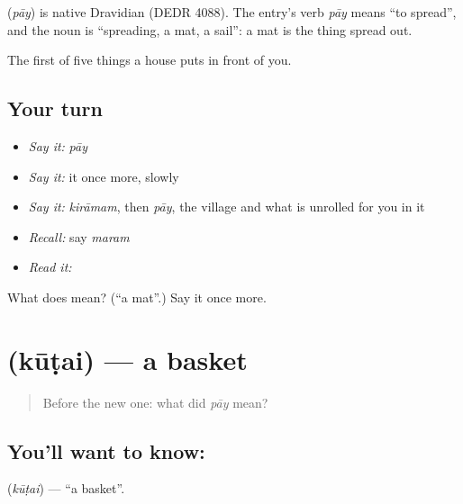 \begin{cousinweb}
\textbf{} (\emph{pāy}) is native Dravidian (DEDR 4088). The entry's verb \emph{pāy} means \textquotedblleft{}to spread\textquotedblright{}, and the noun is \textquotedblleft{}spreading, a mat, a sail\textquotedblright{}: a mat is the thing spread out.
\end{cousinweb}

\begin{grammarlens}[title={What you've built}]
The first of five things a house puts in front of you.
\end{grammarlens}

\subsection*{Your turn}
\begin{itemize}
\raggedright
  \item \emph{Say it:} \emph{pāy}
  \item \emph{Say it:} it once more, slowly
  \item \emph{Say it:} \emph{kirāmam}, then \emph{pāy}, the village and what is unrolled for you in it
  \item \emph{Recall:} say \emph{maram}
  \item \emph{Read it:} \textbf{}
\end{itemize}

\begin{tcolorbox}[breakable,colback=teal!4,colframe=teal!35!black,title={Before you move on}]
What does  mean? (\textquotedblleft{}a mat\textquotedblright{}.) Say it once more.
\end{tcolorbox}
\section[\texorpdfstring{\ta{கூடை} (kūṭai)}{கூடை (kūṭai)}]{ (kūṭai) — a basket}

\label{lesson:TA-C54-basket}



\begin{quote}
Before the new one: what did \emph{pāy} mean?
\end{quote}

\subsection*{You'll want to know: }
\textbf{} (\emph{kūṭai}) — \textquotedblleft{}a basket\textquotedblright{}.

